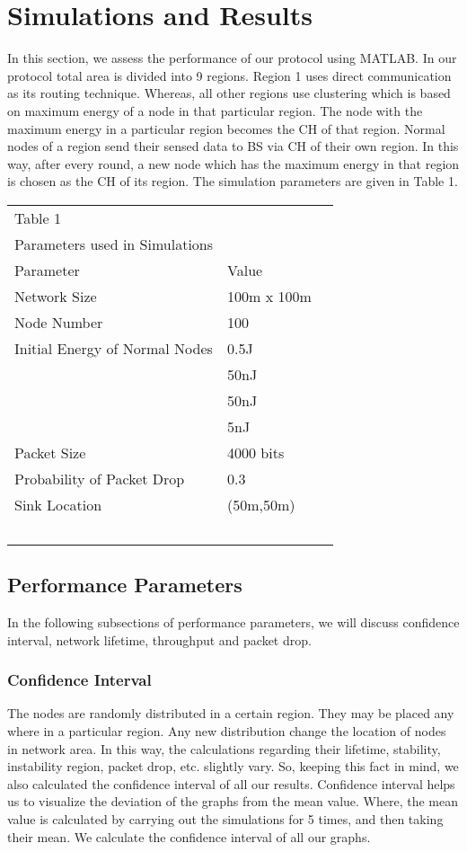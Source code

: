 \documentclass[journal]{IEEEtran}
\begin{document}
\section{Simulations and Results}
In this section, we assess the performance of our protocol using MATLAB. In our protocol total area is divided into 9 regions. Region 1 uses direct communication as its routing technique. Whereas, all other regions use clustering which is based on maximum energy of a node in that particular region. The node with the maximum energy in a particular region becomes the CH of that region. Normal nodes of a region send their sensed data to BS via CH of their own region. In this way, after every round, a new node which has the maximum energy in that region is chosen as the CH of its region. The simulation parameters are given in Table 1.


\begin{center}\begin{tabular}{p{5cm} l  l}
  Table 1&~\\
  Parameters used in Simulations&~\\
  \hline
  Parameter & Value \\
  \hline
  Network Size & 100m x 100m \\ Node Number & 100 \\ Initial Energy of Normal Nodes & 0.5J \\  & 50nJ \\  & 50nJ \\  & 5nJ \\ Packet Size & 4000 bits\\
  Probability of Packet Drop & 0.3\\
  Sink Location & (50m,50m)\\
  \hline
  ~&~\\
\end{tabular}
\end{center}

\subsection{Performance Parameters}

In the following subsections of performance parameters, we will discuss confidence interval, network lifetime, throughput and packet drop.
\subsubsection{Confidence Interval}
The nodes are randomly distributed in a certain region. They may be placed any where in a particular region. Any new distribution change the location of nodes in network area. In this way, the calculations regarding their lifetime, stability, instability region, packet drop, etc. slightly vary. So, keeping this fact in mind, we also calculated the confidence interval of all our results. Confidence interval helps us to visualize the deviation of the graphs from the mean value. Where, the mean value is calculated by carrying out the simulations for 5 times, and then taking their mean. We calculate the confidence interval of all our graphs.
\end{document}
